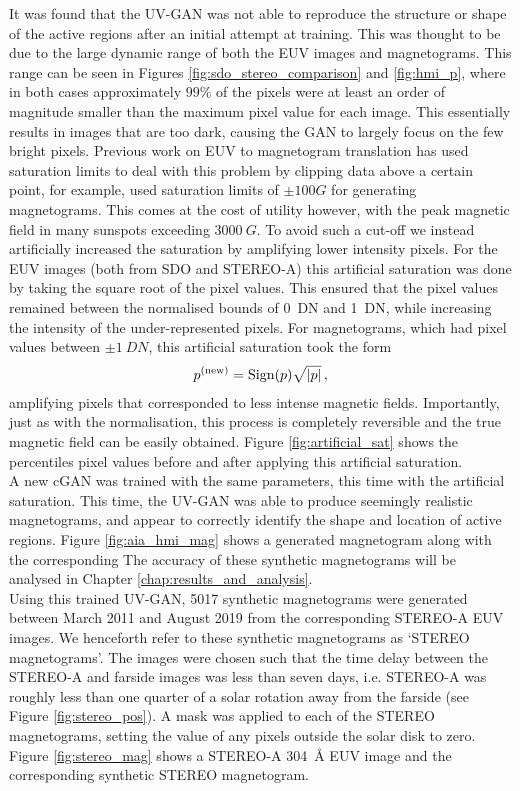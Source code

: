 \documentclass[11pt,a4paper,onecolumn]{report}
\begin{document}
It was found that the UV-GAN was not able to reproduce the structure or shape of
the active regions after an initial attempt at training. This was thought to be
due to the large dynamic range of both the EUV images and magnetograms. This
range can be seen in Figures \ref{fig:sdo_stereo_comparison} and
\ref{fig:hmi_p}, where in both cases approximately $99\%$ of the pixels were at
least an order of magnitude smaller than the maximum pixel value for each image.
This essentially results in images that are too dark, causing the GAN to largely
focus on the few bright pixels. Previous work on EUV to magnetogram translation
has used saturation limits to deal with this problem by clipping data above a
certain point, for example, \citet{Kim2019} used saturation limits of $\pm 100G$
for generating magnetograms. This comes at the cost of utility however, with the
peak magnetic field in many sunspots exceeding $\SI[]{3000}[]{G}$. To avoid such
a cut-off we instead artificially increased the saturation by amplifying lower
intensity pixels. For the EUV images (both from SDO and STEREO-A) this
artificial saturation was done by taking the square root of the pixel values.
This ensured that the pixel values remained between the normalised bounds of
\SI{0}{DN} and \SI{1}{DN}, while increasing the intensity of the
under-represented pixels. For magnetograms, which had pixel values between
$\pm \SI{1}{DN}$, this artificial saturation took the form
\begin{align}
  p^{(\text{new})} = \text{Sign}(p)\sqrt{\absolutevalue{p}}\, ,
\end{align}
amplifying pixels that corresponded to less intense magnetic fields.
Importantly, just as with the normalisation, this process is completely
reversible and the true magnetic field can be easily obtained. Figure
\ref{fig:artificial_sat} shows the percentiles pixel values before and after
applying this artificial saturation. \\


A new cGAN was trained with the same parameters, this time with the artificial
saturation. This time, the UV-GAN was able to produce seemingly realistic
magnetograms, and appear to correctly identify the shape and location of active
regions. Figure \ref{fig:aia_hmi_mag} shows a generated magnetogram along with
the corresponding  The accuracy of these synthetic magnetograms will be analysed in
Chapter \ref{chap:results_and_analysis}. \\


Using this trained UV-GAN, 5017 synthetic magnetograms were generated between
March 2011 and August 2019 from the corresponding STEREO-A EUV images. We
henceforth refer to these synthetic magnetograms as `STEREO magnetograms'. The
images were chosen such that the time delay between the STEREO-A and farside
images was less than seven days, i.e. STEREO-A was roughly less than one quarter
of a solar rotation away from the farside (see Figure \ref{fig:stereo_pos}). A
mask was applied to each of the STEREO magnetograms, setting the value of any
pixels outside the solar disk to zero. Figure \ref{fig:stereo_mag} shows a
STEREO-A \SI{304}{\angstrom} EUV image and the corresponding synthetic STEREO
magnetogram.
\end{document}
